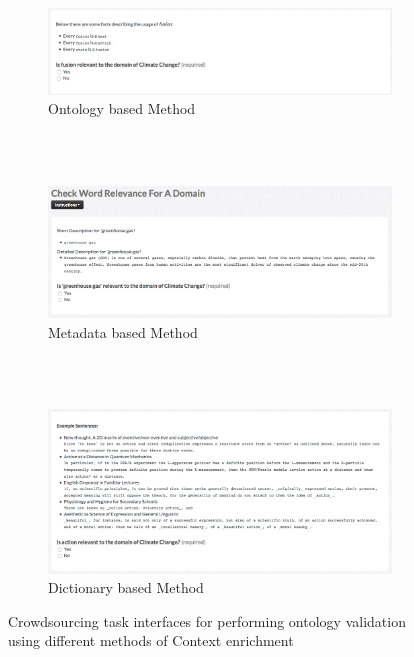 \begin{figure}
    \centering
    \begin{subfigure}[b]{\textwidth}
        \includegraphics[width=\textwidth]{screenshots/questionaire_subclass_relation_context_enrichment}
        \caption{Ontology based Method}
        \label{fig:crowdsourcing_interface_nn}
    \end{subfigure}
	~\\~\\
    \begin{subfigure}[b]{\textwidth}
        \includegraphics[width=\textwidth]{screenshots/questionaire_embedded_context_enrichment}
        \caption{Metadata based Method}
        \label{fig:crowdsourcing_interface_ec}
    \end{subfigure}
	~\\~\\
    \begin{subfigure}[b]{\textwidth}
        \includegraphics[width=\textwidth]{screenshots/questionaire_wordnik_context_enrichment}
        \caption{Dictionary based Method}
        \label{fig:crowdsourcing_interface_es}
    \end{subfigure}
    \caption{Crowdsourcing task interfaces for performing ontology validation using different methods of Context enrichment}\label{fig:all_crowdsourcing_interfaces}
\end{figure}

